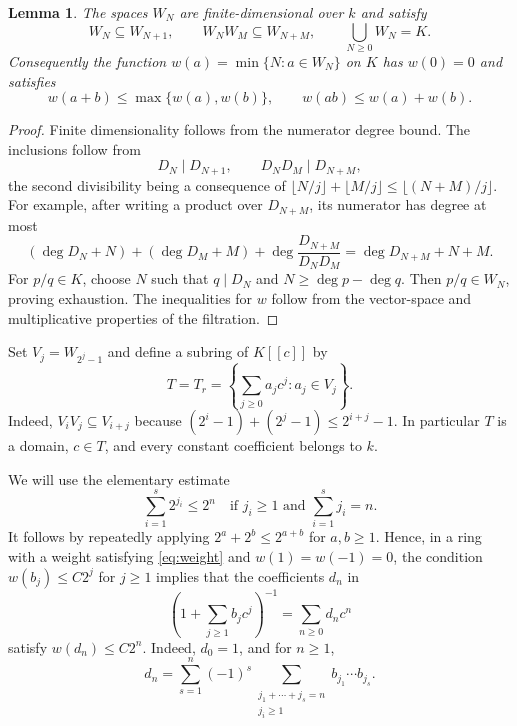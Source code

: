 \documentclass[11pt,reqno]{amsart}
\numberwithin{equation}{section}
\theoremstyle{plain}
\newtheorem{lemma}[theorem]{Lemma}
\theoremstyle{definition}
\theoremstyle{remark}
\begin{document}
\begin{lemma}\label{lem:filtration}
The spaces $W_N$ are finite-dimensional over $k$ and satisfy
\begin{equation}\label{eq:filtration}
 W_N\subseteq W_{N+1},\qquad W_NW_M\subseteq W_{N+M},\qquad
 \bigcup_{N\ge0}W_N=K.
\end{equation}
Consequently the function $w(a)=\min\{N:a\in W_N\}$ on $K$
has $w(0)=0$ and satisfies
\begin{equation}\label{eq:weight}
 w(a+b)\le\max\{w(a),w(b)\},\qquad
 w(ab)\le w(a)+w(b).
\end{equation}
\end{lemma}

\begin{proof}
Finite dimensionality follows from the numerator degree bound.
The inclusions follow from
\[
 D_N\mid D_{N+1},\qquad D_ND_M\mid D_{N+M},
\]
the second divisibility being a consequence of
$\lfloor N/j\rfloor+\lfloor M/j\rfloor\le\lfloor(N+M)/j\rfloor$.
For example, after writing a product over $D_{N+M}$, its numerator
has degree at most
\[
 (\deg D_N+N)+(\deg D_M+M)
       +\deg\frac{D_{N+M}}{D_ND_M}
 =\deg D_{N+M}+N+M.
\]
For $p/q\in K$, choose $N$ such that $q\mid D_N$ and
$N\ge\deg p-\deg q$. Then $p/q\in W_N$, proving exhaustion.
The inequalities for $w$ follow from the vector-space and
multiplicative properties of the filtration.
\end{proof}

Set $V_j=W_{2^j-1}$ and define a subring of $K[[c]]$ by
\begin{equation}\label{eq:T}
 T=T_r=\left\{\sum_{j\ge0}a_jc^j:a_j\in V_j\right\}.
\end{equation}
Indeed, $V_iV_j\subseteq V_{i+j}$ because
$(2^i-1)+(2^j-1)\le2^{i+j}-1$. In particular $T$ is a domain,
$c\in T$, and every constant coefficient belongs to $k$.

We will use the elementary estimate
\begin{equation}\label{eq:composition}
 \sum_{i=1}^{s}2^{j_i}\le2^n
 \quad\text{if }j_i\ge1\text{ and }\sum_{i=1}^{s}j_i=n.
\end{equation}
It follows by repeatedly applying $2^a+2^b\le2^{a+b}$ for
$a,b\ge1$. Hence, in a ring with a weight satisfying
\eqref{eq:weight} and $w(1)=w(-1)=0$, the condition
$w(b_j)\le C2^j$ for $j\ge1$ implies that the coefficients $d_n$ in
\begin{equation}\label{eq:reciprocal}
 \left(1+\sum_{j\ge1}b_jc^j\right)^{-1}=\sum_{n\ge0}d_nc^n
\end{equation}
satisfy $w(d_n)\le C2^n$. Indeed, $d_0=1$, and for $n\ge1$,
\[
 d_n=\sum_{s=1}^{n}(-1)^s
       \sum_{\substack{j_1+\cdots+j_s=n\\j_i\ge1}}
           b_{j_1}\cdots b_{j_s}.
\]
\end{document}
